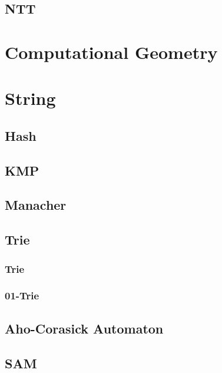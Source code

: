 \documentclass[a4paper]{article}
\begin{document}
\subsection{NTT}



\section{Computational Geometry}



\pagebreak

\section{String}

\subsection{Hash}



\subsection{KMP}



\subsection{Manacher}



\subsection{Trie}

\subsubsection{Trie}



\subsubsection{01-Trie}



\subsection{Aho-Corasick Automaton}

\subsection{SAM}


\end{document}
